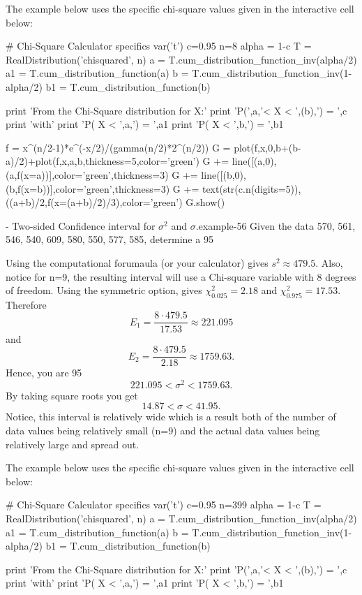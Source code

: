 \documentclass[10pt,]{book}
\numberwithin{equation}{section}
\newcommand{\lt}{<}
\begin{document}
The example below uses the specific chi-square values given in the interactive cell below: \leavevmode%
\begin{sageinput}
# Chi-Square Calculator specifics
var('t')
c=0.95
n=8
alpha = 1-c
T = RealDistribution('chisquared', n)
a = T.cum_distribution_function_inv(alpha/2)
a1 = T.cum_distribution_function(a)
b = T.cum_distribution_function_inv(1-alpha/2)
b1 = T.cum_distribution_function(b)

print 'From the Chi-Square distribution for X:'
print 'P(',a,'< X < ',(b),') = ',c
print 'with'
print 'P( X < ',a,') = ',a1
print 'P( X < ',b,') = ',b1

f = x^(n/2-1)*e^(-x/2)/(gamma(n/2)*2^(n/2))
G = plot(f,x,0,b+(b-a)/2)+plot(f,x,a,b,thickness=5,color='green')
G += line([(a,0),(a,f(x=a))],color='green',thickness=3)
G += line([(b,0),(b,f(x=b))],color='green',thickness=3)
G += text(str(c.n(digits=5)),((a+b)/2,f(x=(a+b)/2)/3),color='green')
G.show()
\end{sageinput}
 \begin{example}{- Two-sided Confidence interval for \(\sigma^2\) and \(\sigma\).}{example-56}%
\hypertarget{p-1335}{}%
Given the data 570, 561, 546, 540, 609, 580, 550, 577, 585, determine a 95%
\par
\hypertarget{p-1336}{}%
Using the computational forumaula (or your calculator) gives \(s^2 \approx 479.5\). Also, notice for n=9, the resulting interval will use a Chi-square variable with 8 degrees of freedom. Using the symmetric option, gives \(\chi_{0.025}^2 = 2.18\) and \(\chi_{0.975}^2 = 17.53\).  Therefore%
\begin{equation*}
E_1 = \frac{8 \cdot 479.5}{17.53} \approx 221.095
\end{equation*}
and%
\begin{equation*}
E_2 = \frac{8 \cdot 479.5}{2.18} \approx 1759.63.
\end{equation*}
Hence, you are 95%
\begin{equation*}
221.095 \lt \sigma^2 \lt 1759.63.
\end{equation*}
By taking square roots you get%
\begin{equation*}
14.87 \lt \sigma \lt 41.95.
\end{equation*}
Notice, this interval is relatively wide which is a result both of the number of data values being relatively small (n=9) and the actual data values being relatively large and spread out.%
\end{example}
 The example below uses the specific chi-square values given in the interactive cell below: \begin{sageinput}
# Chi-Square Calculator specifics
var('t')
c=0.95
n=399
alpha = 1-c
T = RealDistribution('chisquared', n)
a = T.cum_distribution_function_inv(alpha/2)
a1 = T.cum_distribution_function(a)
b = T.cum_distribution_function_inv(1-alpha/2)
b1 = T.cum_distribution_function(b)

print 'From the Chi-Square distribution for X:'
print 'P(',a,'< X < ',(b),') = ',c
print 'with'
print 'P( X < ',a,') = ',a1
print 'P( X < ',b,') = ',b1
\end{sageinput}
\end{document}
